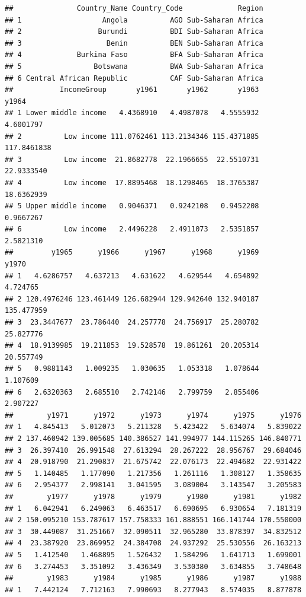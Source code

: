 \documentclass[]{book}
\begin{document}
\begin{verbatim}
##               Country_Name Country_Code             Region
## 1                   Angola          AGO Sub-Saharan Africa
## 2                  Burundi          BDI Sub-Saharan Africa
## 3                    Benin          BEN Sub-Saharan Africa
## 4             Burkina Faso          BFA Sub-Saharan Africa
## 5                 Botswana          BWA Sub-Saharan Africa
## 6 Central African Republic          CAF Sub-Saharan Africa
##           IncomeGroup       y1961       y1962       y1963       y1964
## 1 Lower middle income   4.4368910   4.4987078   4.5555932   4.6001797
## 2          Low income 111.0762461 113.2134346 115.4371885 117.8461838
## 3          Low income  21.8682778  22.1966655  22.5510731  22.9333540
## 4          Low income  17.8895468  18.1298465  18.3765387  18.6362939
## 5 Upper middle income   0.9046371   0.9242108   0.9452208   0.9667267
## 6          Low income   2.4496228   2.4911073   2.5351857   2.5821310
##         y1965      y1966      y1967      y1968      y1969      y1970
## 1   4.6286757   4.637213   4.631622   4.629544   4.654892   4.724765
## 2 120.4976246 123.461449 126.682944 129.942640 132.940187 135.477959
## 3  23.3447677  23.786440  24.257778  24.756917  25.280782  25.827776
## 4  18.9139985  19.211853  19.528578  19.861261  20.205314  20.557749
## 5   0.9881143   1.009235   1.030635   1.053318   1.078644   1.107609
## 6   2.6320363   2.685510   2.742146   2.799759   2.855406   2.907227
##        y1971      y1972      y1973      y1974      y1975      y1976
## 1   4.845413   5.012073   5.211328   5.423422   5.634074   5.839022
## 2 137.460942 139.005685 140.386527 141.994977 144.115265 146.840771
## 3  26.397410  26.991548  27.613294  28.267222  28.956767  29.684046
## 4  20.918790  21.290837  21.675742  22.076173  22.494682  22.931422
## 5   1.140485   1.177090   1.217356   1.261116   1.308127   1.358635
## 6   2.954377   2.998141   3.041595   3.089004   3.143547   3.205583
##        y1977      y1978      y1979      y1980      y1981      y1982
## 1   6.042941   6.249063   6.463517   6.690695   6.930654   7.181319
## 2 150.095210 153.787617 157.758333 161.888551 166.141744 170.550000
## 3  30.449087  31.251667  32.090511  32.965280  33.878397  34.832512
## 4  23.387920  23.869952  24.384708  24.937292  25.530556  26.163213
## 5   1.412540   1.468895   1.526432   1.584296   1.641713   1.699001
## 6   3.274453   3.351092   3.436349   3.530380   3.634855   3.748648
##        y1983      y1984      y1985      y1986      y1987      y1988
## 1   7.442124   7.712163   7.990693   8.277943   8.574035   8.877878

\end{verbatim}
\end{document}
